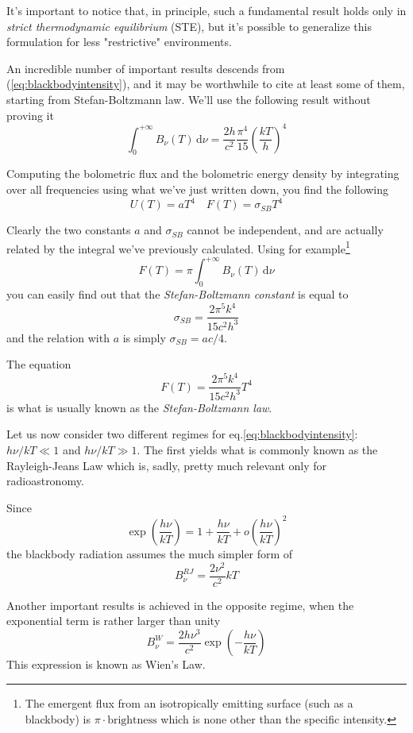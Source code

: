 \par It's important to notice that, in principle, such a fundamental result holds only in \emph{strict thermodynamic equilibrium} (STE), but it's possible to generalize this formulation for less "restrictive" environments.
\par An incredible number of important results descends from (\ref{eq:blackbodyintensity}), and it may be worthwhile to cite at least some of them, starting from Stefan-Boltzmann law. We'll use the following result without proving it 
\begin{equation*}
	\int_{0}^{+\infty} B_{\nu}(T)\,\text{d}\nu = \frac{2h}{c^{2}}\frac{\pi^{4}}{15}\left(\frac{kT}{h}\right)^{4}
\end{equation*}
\par Computing the bolometric flux and the bolometric energy density by integrating over all frequencies using what we've just written down, you find the following 
\begin{equation*}
	U(T) = aT^{4} \quad F(T) = \sigma_{SB}T^{4}
\end{equation*}
\par Clearly the two constants $a$ and $\sigma_{SB}$ cannot be independent, and are actually related by the integral we've previously calculated. Using for example\footnote{The emergent flux from an isotropically emitting surface (such as a blackbody) is $\pi\cdot \text{brightness}$ which is none other than the specific intensity.}
\begin{equation*}
	F(T) = \pi \int_{0}^{+\infty} B_{\nu}(T)\,\text{d}\nu
\end{equation*}
you can easily find out that the \emph{Stefan-Boltzmann constant} is equal to $$ \sigma_{SB} = \frac{2\pi^{5}k^{4}}{15c^{2}h^{3}}$$
and the relation with $a$ is simply $\sigma_{SB} = ac/4$.
\par The equation 
\begin{equation}
	F(T) = \frac{2\pi^{5}k^{4}}{15c^{2}h^{3}} T^{4}
	\label{eq:SB}
\end{equation}
is what is usually known as the \emph{Stefan-Boltzmann law}.
\par Let us now consider two different regimes for eq.\ref{eq:blackbodyintensity}: $h\nu/kT \ll 1$ and $h\nu/kT \gg 1$. The first yields what is commonly known as the Rayleigh-Jeans Law which is, sadly, pretty much relevant only for radioastronomy.
\par Since 
\begin{equation*}
	\exp\left(\frac{h\nu}{kT}\right) = 1+\frac{h\nu}{kT}+o\left(\frac{h\nu}{kT}\right)^{2}
\end{equation*} 
the blackbody radiation assumes the much simpler form of
\begin{equation*}
	B_{\nu}^{RJ} = \frac{2\nu^{2}}{c^{2}}kT
\end{equation*}
\par Another important results is achieved in the opposite regime, when the exponential term is rather larger than unity
\begin{equation*}
	B_{\nu}^{W} = \frac{2h\nu^{3}}{c^{2}}\exp\left(-\frac{h\nu}{kT}\right)
\end{equation*}
This expression is known as Wien's Law.

